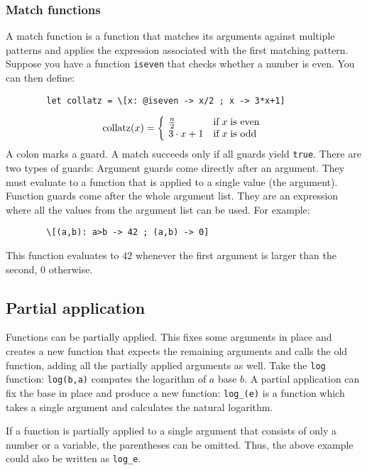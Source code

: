 \documentclass[10pt]{article}
\begin{document}
    \subsubsection{Match functions}
    A match function is a function that matches its arguments against multiple patterns and applies the expression associated with the first matching pattern.
    Suppose you have a function \verb|iseven| that checks whether a number is even.
    You can then define:
    \begin{verbatim}
        let collatz = \[x: @iseven -> x/2 ; x -> 3*x+1]
    \end{verbatim}
    \[
        \mathrm{collatz}(x) = \left\{\kern-\nulldelimiterspace\begin{array}{ll}
            \frac{n}{2}   & \textrm{if}\;x\;\textrm{is even} \\
            3 \cdot x + 1 & \textrm{if}\;x\;\textrm{is odd}
        \end{array} \right.
    \]
    A colon marks a guard.
    A match succeeds only if all guards yield \verb|true|.
    There are two types of guards: Argument guards come directly after an argument.
    They must evaluate to a function that is applied to a single value (the argument).
    Function guards come after the whole argument list.
    They are an expression where all the values from the argument list can be used.
    For example:
    \begin{verbatim}
        \[(a,b): a>b -> 42 ; (a,b) -> 0]
    \end{verbatim}
    This function evaluates to $ 42 $ whenever the first argument is larger than the second, $ 0 $ otherwise.
    
    \subsection{Partial application}\label{subsec:partial-application}
    Functions can be partially applied.
    This fixes some arguments in place and creates a new function that expects the remaining arguments and calls the old function, adding all the partially applied arguments as well.
    Take the \verb|log| function: \verb|log(b,a)| computes the logarithm of $ a $ base $ b $.
    A partial application can fix the base in place and produce a new function:
    \verb|log_(e)| is a function which takes a single argument and calculates the natural logarithm.
    
    If a function is partially applied to a single argument that consists of only a number or a variable, the parentheses can be omitted.
    Thus, the above example could also be written as \verb|log_e|.
    
\end{document}
